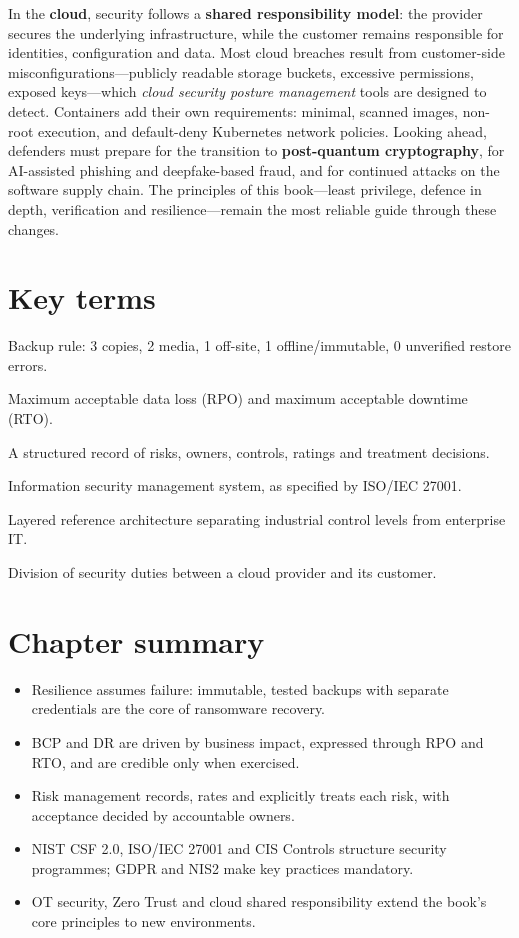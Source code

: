 \documentclass[11pt,openany]{book}
\begin{document}
In the \textbf{cloud}, security follows a \textbf{shared responsibility model}: the provider secures the underlying infrastructure, while the customer remains responsible for identities, configuration and data. Most cloud breaches result from customer-side misconfigurations—publicly readable storage buckets, excessive permissions, exposed keys—which \emph{cloud security posture management} tools are designed to detect. Containers add their own requirements: minimal, scanned images, non-root execution, and default-deny Kubernetes network policies. Looking ahead, defenders must prepare for the transition to \textbf{post-quantum cryptography}, for AI-assisted phishing and deepfake-based fraud, and for continued attacks on the software supply chain. The principles of this book—least privilege, defence in depth, verification and resilience—remain the most reliable guide through these changes.

\section*{Key terms}
\begin{description}[style=nextline,leftmargin=1.2em]
  \item[3-2-1-1-0] Backup rule: 3 copies, 2 media, 1 off-site, 1 offline/immutable, 0 unverified restore errors.
  \item[RPO / RTO] Maximum acceptable data loss (RPO) and maximum acceptable downtime (RTO).
  \item[Risk register] A structured record of risks, owners, controls, ratings and treatment decisions.
  \item[ISMS] Information security management system, as specified by ISO/IEC 27001.
  \item[Purdue model] Layered reference architecture separating industrial control levels from enterprise IT.
  \item[Shared responsibility] Division of security duties between a cloud provider and its customer.
\end{description}

\section*{Chapter summary}
\begin{itemize}
  \item Resilience assumes failure: immutable, tested backups with separate credentials are the core of ransomware recovery.
  \item BCP and DR are driven by business impact, expressed through RPO and RTO, and are credible only when exercised.
  \item Risk management records, rates and explicitly treats each risk, with acceptance decided by accountable owners.
  \item NIST CSF 2.0, ISO/IEC 27001 and CIS Controls structure security programmes; GDPR and NIS2 make key practices mandatory.
  \item OT security, Zero Trust and cloud shared responsibility extend the book's core principles to new environments.
\end{itemize}
\end{document}
